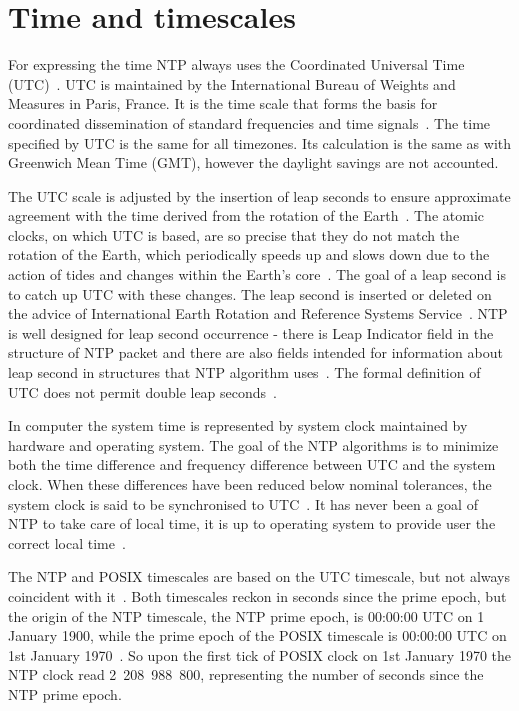 
\section{Time and timescales}\label{sec:ntp-time}
For expressing the time NTP always uses the Coordinated Universal Time (UTC)~\cite{rfc5905}.
UTC is maintained by the International Bureau of Weights and Measures in Paris, France.
It is the time scale that forms the basis for coordinated dissemination
of standard frequencies and time signals~\cite{bipm-utc}.
The time specified by UTC is the same for all timezones.
Its calculation is the same as with Greenwich Mean Time (GMT),
however the daylight savings are not accounted.

The UTC scale is adjusted by the insertion of leap seconds to ensure approximate
agreement with the time derived from the rotation of the Earth~\cite{bipm-utc}.
The atomic clocks, on which UTC is based, are so precise that
they do not match the rotation of the Earth,
which periodically speeds up and slows down due to the action
of tides and changes within the Earth's core~\cite{cnn-earth}.
The goal of a leap second is to catch up UTC with these changes.
The leap second is inserted or deleted on the advice of
International Earth Rotation and Reference Systems Service~\cite{bipm-utc}.
NTP is well designed for leap second occurrence -
there is Leap Indicator field
in the structure of NTP packet and there are also fields intended for
information about leap second in structures that NTP algorithm uses~\cite{rfc5905}.
The formal definition of UTC does not permit double leap seconds~\cite{posix}.

In computer the system time is represented by system clock maintained by
hardware and operating system.
The goal of the NTP algorithms is to minimize
both the time difference and frequency difference between UTC and the system clock.
When these differences have been reduced below nominal
tolerances, the system clock is said to be synchronised to UTC~\cite{rfc5905}.
It has never been a goal of NTP to take care of local time,
it is up to operating system to provide user the correct local time~\cite{ntp-overview}.

The NTP and POSIX timescales are based on the UTC timescale,
but not always coincident with it~\cite{ntp-leap}.
Both timescales reckon in seconds since the prime epoch,
but the origin of the NTP timescale, the NTP prime epoch, is 00:00:00 UTC on 1 January 1900,
while the prime epoch of the POSIX timescale is 00:00:00 UTC on 1st January 1970~\cite{ntp-leap}.
So upon the first tick of POSIX clock on 1st January 1970 the NTP clock read 2~208~988~800,
representing the number of seconds since the NTP prime epoch.
